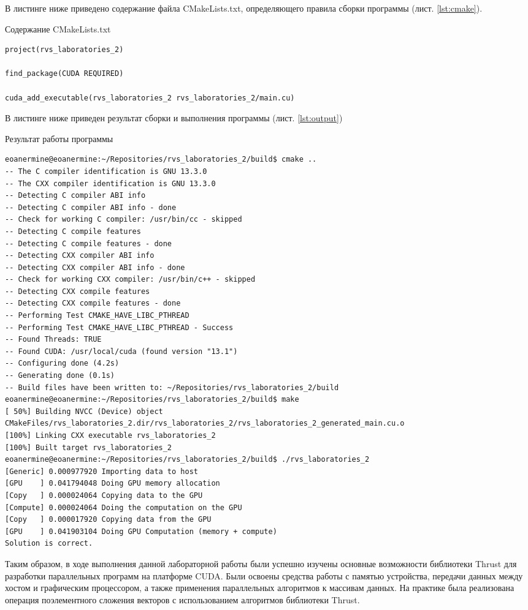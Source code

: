 \documentclass[14pt]{extarticle}
\makeatletter
\newenvironment{code}{\captionsetup{type=listing, belowskip=-14pt plus 3pt minus 0pt}}{}
\newcounter{sectionc} %
\newcommand{\nonumbersections}{\renewcommand{\Hy@numberline}[1]{}}
\let\oldsectionc\sectionc
\renewcommand{\sectionc}{\nonumbersections\oldsectionc}
\makeatother
\begin{document}
\pagebreak

В листинге ниже приведено содержание файла CMakeLists.txt, определяющего правила сборки программы (лист. \ref{lst:cmake}).

\begin{code}    
\caption{Содержание CMakeLists.txt\label{lst:cmake}}
\begin{verbatim}
project(rvs_laboratories_2)

find_package(CUDA REQUIRED)

cuda_add_executable(rvs_laboratories_2 rvs_laboratories_2/main.cu)
\end{verbatim}
\end{code}

В листинге ниже приведен результат сборки и выполнения программы (лист. \ref{lst:output})

\begin{code}    
\caption{Результат работы программы\label{lst:output}}
\begin{verbatim}
eoanermine@eoanermine:~/Repositories/rvs_laboratories_2/build$ cmake ..
-- The C compiler identification is GNU 13.3.0
-- The CXX compiler identification is GNU 13.3.0
-- Detecting C compiler ABI info
-- Detecting C compiler ABI info - done
-- Check for working C compiler: /usr/bin/cc - skipped
-- Detecting C compile features
-- Detecting C compile features - done
-- Detecting CXX compiler ABI info
-- Detecting CXX compiler ABI info - done
-- Check for working CXX compiler: /usr/bin/c++ - skipped
-- Detecting CXX compile features
-- Detecting CXX compile features - done
-- Performing Test CMAKE_HAVE_LIBC_PTHREAD
-- Performing Test CMAKE_HAVE_LIBC_PTHREAD - Success
-- Found Threads: TRUE
-- Found CUDA: /usr/local/cuda (found version "13.1")
-- Configuring done (4.2s)
-- Generating done (0.1s)
-- Build files have been written to: ~/Repositories/rvs_laboratories_2/build
eoanermine@eoanermine:~/Repositories/rvs_laboratories_2/build$ make
[ 50%] Building NVCC (Device) object CMakeFiles/rvs_laboratories_2.dir/rvs_laboratories_2/rvs_laboratories_2_generated_main.cu.o
[100%] Linking CXX executable rvs_laboratories_2
[100%] Built target rvs_laboratories_2
eoanermine@eoanermine:~/Repositories/rvs_laboratories_2/build$ ./rvs_laboratories_2
[Generic] 0.000977920 Importing data to host
[GPU    ] 0.041794048 Doing GPU memory allocation
[Copy   ] 0.000024064 Copying data to the GPU
[Compute] 0.000024064 Doing the computation on the GPU
[Copy   ] 0.000017920 Copying data from the GPU
[GPU    ] 0.041903104 Doing GPU Computation (memory + compute)
Solution is correct.
\end{verbatim}
\end{code}


Таким образом, в ходе выполнения данной лабораторной работы были успешно изучены основные возможности библиотеки Thrust для разработки параллельных программ на платформе CUDA. Были освоены средства работы с памятью устройства, передачи данных между хостом и графическим процессором, а также применения параллельных алгоритмов к массивам данных. На практике была реализована операция поэлементного сложения векторов с использованием алгоритмов библиотеки Thrust.
\end{document}
